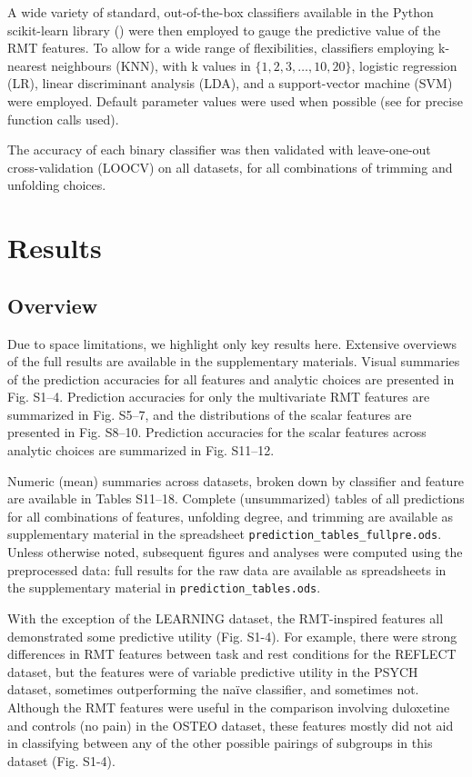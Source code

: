 A wide variety of standard, out-of-the-box classifiers available in the Python scikit-learn library
(\cite{pedregosaScikitlearnMachineLearning2011}) were then employed to gauge the predictive value of
the RMT features. To allow for a wide range of flexibilities, classifiers employing k-nearest
neighbours (KNN), with k values in \(\{1, 2, 3, \dots, 10, 20\}\), logistic regression (LR), linear
discriminant analysis (LDA), and a support-vector machine (SVM) were employed. Default parameter
values were used when possible (see \cite{bergerderekm.DMBergerRandommatrixfmriV02020} for precise
function calls used).

The accuracy of each binary classifier was then validated with leave-one-out cross-validation
(LOOCV) on all datasets, for all combinations of trimming and unfolding choices.

\section{Results}

\subsection{Overview}
Due to space limitations, we highlight only key results here. Extensive overviews of the full
results are available in the supplementary materials. Visual summaries of the prediction accuracies
for all features and analytic choices are presented in Fig. S1--4. Prediction accuracies for only the
multivariate RMT features are summarized in Fig. S5--7, and the distributions of the scalar features
are presented in Fig. S8--10. Prediction accuracies for the scalar features across analytic choices
are summarized in Fig. S11--12.

Numeric (mean) summaries across datasets, broken down by classifier and feature are available in
Tables S11--18. Complete (unsummarized) tables of all predictions for all combinations of features,
unfolding degree, and trimming are available as supplementary material in the spreadsheet
\texttt{prediction\_tables\_fullpre.ods}. Unless otherwise noted, subsequent figures and analyses were
computed using the preprocessed data: full results for the raw data are available as spreadsheets in
the supplementary material in \texttt{prediction\_tables.ods}.

With the exception of the LEARNING dataset, the RMT-inspired features all demonstrated some
predictive utility (Fig. S1-4). For example, there were strong differences in RMT features between
task and rest conditions for the REFLECT dataset, but the features were of variable predictive
utility in the PSYCH dataset, sometimes outperforming the naïve classifier, and sometimes not.
Although the RMT features were useful in the comparison involving duloxetine and controls (no pain)
in the OSTEO dataset, these features mostly did not aid in classifying between any of the other
possible pairings of subgroups in this dataset (Fig. S1-4).

